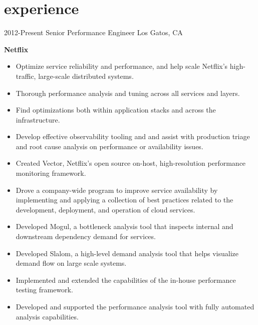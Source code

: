 \section{experience}

\begin{entrylist}
  \entry
    {2012-Present}
    {Senior Performance Engineer}
    {Los Gatos, CA}
    {
      \textbf{Netflix}
      \begin{itemize}
        \item Optimize service reliability and performance, and help scale Netflix's high-traffic, large-scale distributed systems.
        \item Thorough performance analysis and tuning across all services and layers.
        \item Find optimizations both within application stacks and across the infrastructure.
        \item Develop effective observability tooling and and assist with production triage and root cause analysis on performance or availability issues.  
      \end{itemize}
      \begin{itemize}
        \item Created Vector, Netflix's open source on-host, high-resolution performance monitoring framework.
        \item Drove a company-wide program to improve service availability by implementing and applying a collection of best practices related to the development, deployment, and operation of cloud services.
        \item Developed Mogul, a bottleneck analysis tool that inspects internal and downstream dependency demand for services.
        \item Developed Slalom, a high-level demand analysis tool that helps visualize demand flow on large scale systems.
        \item Implemented and extended the capabilities of the in-house performance testing framework.
        \item Developed and supported the performance analysis tool with fully automated analysis capabilities.
      \end{itemize}
    }
  \entry

\end{entrylist}
